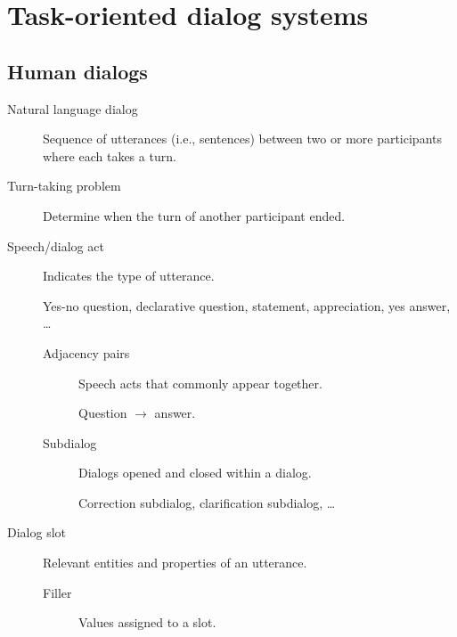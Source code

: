 \chapter{Task-oriented dialog systems}


\section{Human dialogs}

\begin{description}
    \item[Natural language dialog] 
        Sequence of utterances (i.e., sentences) between two or more participants where each takes a turn.

    \item[Turn-taking problem] 
        Determine when the turn of another participant ended.

    \item[Speech/dialog act] 
        Indicates the type of utterance.

        \begin{example}
            Yes-no question, declarative question, statement, appreciation, yes answer, \dots
        \end{example}

        \begin{description}
            \item[Adjacency pairs]
                Speech acts that commonly appear together.

                \begin{example}
                    Question $\rightarrow$ answer.
                \end{example}

            \item[Subdialog]
                Dialogs opened and closed within a dialog.

                \begin{example}
                    Correction subdialog, clarification subdialog, \dots
                \end{example}
        \end{description}

    \item[Dialog slot] 
        Relevant entities and properties of an utterance.

        \begin{description}
            \item[Filler] Values assigned to a slot. 
        \end{description}


\end{description}
